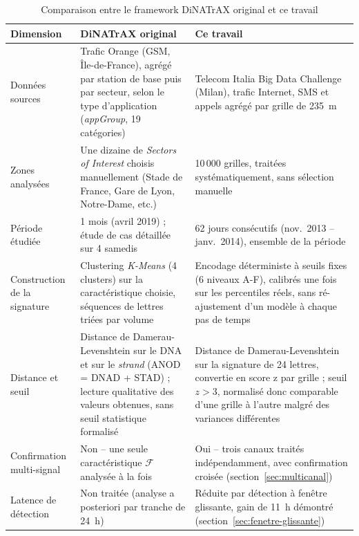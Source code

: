\begin{table}[htbp]
  \centering
  \caption{Comparaison entre le framework DiNATrAX original et ce travail}
  \label{tab:comparaison-dinatrax}
  \small
  \begin{tabular}{lp{5.4cm}p{5.4cm}}
    \toprule
    \textbf{Dimension} & \textbf{DiNATrAX original~\parencite{maudoux2024dinatrax}} & \textbf{Ce travail} \\
    \midrule
    Données sources &
      Trafic Orange (GSM, Île-de-France), agrégé par station de base
      puis par secteur, selon le type d'application (\emph{appGroup},
      19 catégories) &
      Telecom Italia Big Data Challenge (Milan), trafic Internet, SMS
      et appels agrégé par grille de 235~m \\
    Zones analysées &
      Une dizaine de \emph{Sectors of Interest} choisis manuellement
      (Stade de France, Gare de Lyon, Notre-Dame, etc.) &
      10\,000 grilles, traitées systématiquement, sans sélection
      manuelle \\
    Période étudiée &
      1 mois (avril 2019) ; étude de cas détaillée sur 4 samedis &
      62 jours consécutifs (nov.\ 2013 -- janv.\ 2014), ensemble de la
      période \\
    Construction de la signature &
      Clustering \emph{K-Means} (4 clusters) sur la caractéristique
      choisie, séquences de lettres triées par volume &
      Encodage déterministe à seuils fixes (6 niveaux A-F), calibrés
      une fois sur les percentiles réels, sans ré-ajustement d'un
      modèle à chaque pas de temps \\
    Distance et seuil &
      Distance de Damerau-Levenshtein sur le DNA et sur le
      \emph{strand} (ANOD = DNAD + STAD) ; lecture qualitative des
      valeurs obtenues, sans seuil statistique formalisé &
      Distance de Damerau-Levenshtein sur la signature de 24 lettres,
      convertie en score z par grille ; seuil $z>3$, normalisé donc
      comparable d'une grille à l'autre malgré des variances
      différentes \\
    Confirmation multi-signal &
      Non -- une seule caractéristique $\mathcal{F}$ analysée à la fois &
      Oui -- trois canaux traités indépendamment, avec confirmation
      croisée (section~\ref{sec:multicanal}) \\
    Latence de détection &
      Non traitée (analyse a posteriori par tranche de 24~h) &
      Réduite par détection à fenêtre glissante, gain de 11~h démontré
      (section~\ref{sec:fenetre-glissante}) \\

\end{tabular}
\end{table}
